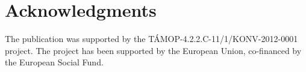 \documentclass{acm_proc_article-me}
\begin{document}


\section{Acknowledgments}

The publication was supported by the T\'AMOP-4.2.2.C-11/1/KONV-2012-0001 project. The project has been supported by the European Union, co-financed by the European Social Fund.



\end{document}
